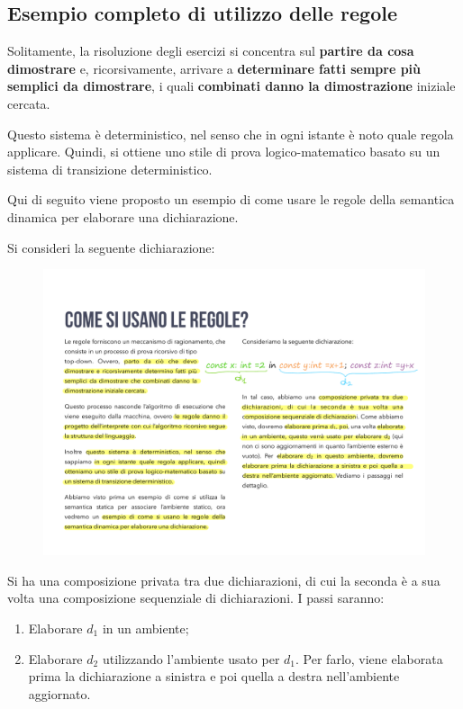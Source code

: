 \documentclass[a4paper]{article}
\begin{document}
	\subsection{Esempio completo di utilizzo delle regole}
	
	Solitamente, la risoluzione degli esercizi si concentra sul \textbf{partire da cosa dimostrare} e, ricorsivamente, arrivare a \textbf{determinare fatti sempre più semplici da dimostrare}, i quali \textbf{combinati danno la dimostrazione} iniziale cercata.\newline
	
	\noindent
	Questo sistema è deterministico, nel senso che in ogni istante è noto quale regola applicare. Quindi, si ottiene uno stile di prova logico-matematico basato su un sistema di transizione deterministico.\newline
	
	\noindent
	Qui di seguito viene proposto un esempio di come usare le regole della semantica dinamica per elaborare una dichiarazione.\newline
	
	\noindent
	Si consideri la seguente dichiarazione:
	\begin{figure}[!htp]
		\centering
		\includegraphics[width=.8\textwidth]{img/regola_dichiarazione-ex1.pdf}
	\end{figure}
	
	\noindent
	Si ha una composizione privata tra due dichiarazioni, di cui la seconda è a sua volta una composizione sequenziale di dichiarazioni. I passi saranno:
	\begin{enumerate}
		\item Elaborare $d_{1}$ in un ambiente;
		\item Elaborare $d_{2}$ utilizzando l'ambiente usato per $d_{1}$. Per farlo, viene elaborata prima la dichiarazione a sinistra e poi quella a destra nell'ambiente aggiornato.
	\end{enumerate}
	
\end{document}
